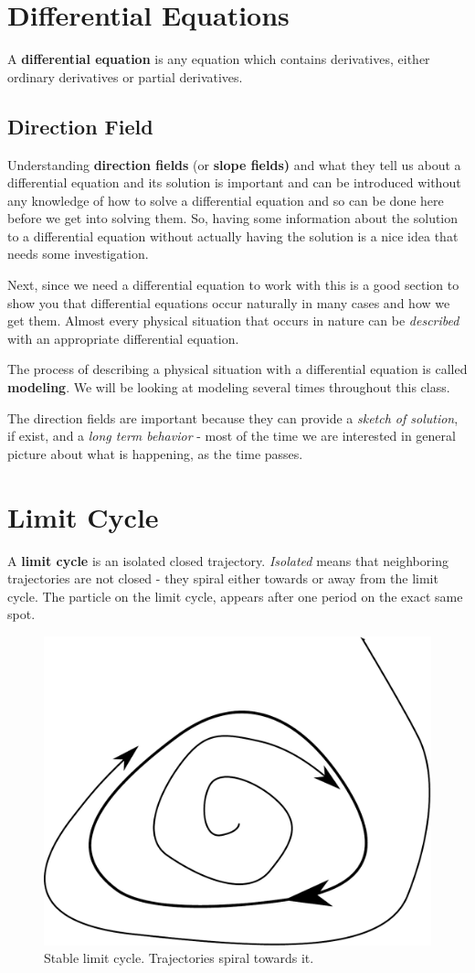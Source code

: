 \documentclass[journal]{IEEEtran}
\begin{document}
\section{Differential Equations}
A \textbf{differential equation} is any equation which contains derivatives, either ordinary derivatives or partial derivatives.

\subsection{Direction Field}
Understanding \textbf{direction fields} (or \textbf{slope fields)} and what they tell us about a differential equation and its solution is important and can be introduced without any knowledge of how to solve a differential equation and so can be done here before we get into solving them.  So, having some information about the solution to a differential equation without actually having the solution is a nice idea that needs some investigation.
 
Next, since we need a differential equation to work with this is a good section to show you that differential equations occur naturally in many cases and how we get them.  Almost every physical situation that occurs in nature can be \textit{described} with an appropriate differential equation.  
 
The process of describing a physical situation with a differential equation is called \textbf{modeling}. We will be looking at modeling several times throughout this class.

The direction fields are important because they can provide a \textit{sketch of solution}, if exist, and a \textit{long term behavior} - most of the time we are interested in general picture about what is happening, as the time passes.

\section{Limit Cycle}
A \textbf{limit cycle} is an isolated closed trajectory. \textit{Isolated} means that neighboring trajectories are not closed - they spiral either towards or away from the limit cycle. The particle on the limit cycle, appears after one period on the exact same spot.

\begin{figure}[ht!]
	\centering
	\includegraphics[width=.6\linewidth]{lcycle_stable}
	\caption{Stable limit cycle. Trajectories spiral towards it.}
	\label{f:lc_st}
\end{figure}
\end{document}
